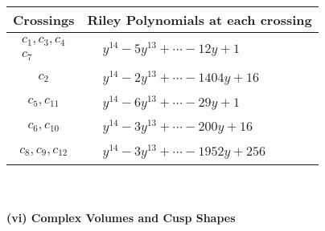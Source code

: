 \documentclass[1p]{elsarticle_modified}
\theoremstyle{definition}
\begin{document}
\begin{tabular}{m{50pt}|m{274pt}}
Crossings & \hspace{64pt}Riley Polynomials at each crossing \\
\hline $$\begin{aligned}c_{1},c_{3},c_{4}\\c_{7}\end{aligned}$$&$\begin{aligned}
&y^{14}-5 y^{13}+\cdots-12 y+1
\end{aligned}$\\
\hline $$\begin{aligned}c_{2}\end{aligned}$$&$\begin{aligned}
&y^{14}-2 y^{13}+\cdots-1404 y+16
\end{aligned}$\\
\hline $$\begin{aligned}c_{5},c_{11}\end{aligned}$$&$\begin{aligned}
&y^{14}-6 y^{13}+\cdots-29 y+1
\end{aligned}$\\
\hline $$\begin{aligned}c_{6},c_{10}\end{aligned}$$&$\begin{aligned}
&y^{14}-3 y^{13}+\cdots-200 y+16
\end{aligned}$\\
\hline $$\begin{aligned}c_{8},c_{9},c_{12}\end{aligned}$$&$\begin{aligned}
&y^{14}-3 y^{13}+\cdots-1952 y+256
\end{aligned}$\\
\hline
\end{tabular}\\~\\
\newpage\flushleft \textbf{(vi) Complex Volumes and Cusp Shapes}
\end{document}
